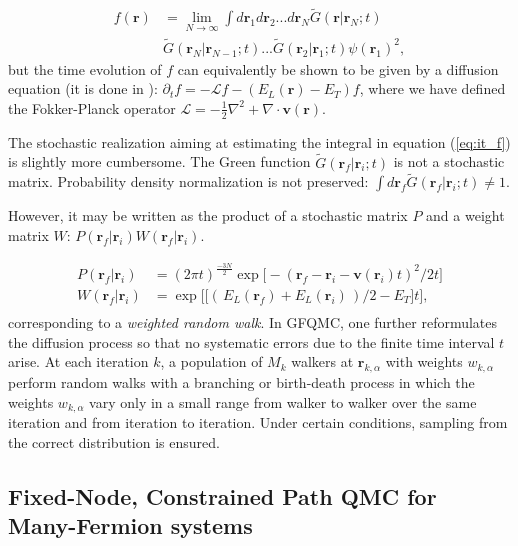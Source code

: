 \begin{equation}\label{eq:it_f}
\begin{split}
f(\bm r) &= \lim_{N\rightarrow \infty} \int d\bm r_1 d\bm r_2 ... d\bm r_N \tilde{G}(\bm r| \bm r_N ;t) \\
&\tilde{G}(\bm r_N| \bm r_{N-1} ;t) ... \tilde{G}(\bm r_2| \bm r_1 ;t) \psi(\bm r_1)^2 ,
\end{split}
\end{equation}
but the time evolution of $f$ can equivalently be shown to be given by a diffusion equation (it is done in \cite{vmc_review}): $\partial_t f = -\mathcal{L}f - (E_L (\bm r) - E_T)f$, 
where we have defined the Fokker-Planck operator $\mathcal{L} = -\frac{1}{2}\nabla^2 + \nabla \cdot \bm v(\bm r)$.\par

The stochastic realization aiming at estimating the integral in equation (\ref{eq:it_f}) is slightly more cumbersome. The Green function $\tilde{G}(\bm r_f| \bm r_i ;t)$ is not a stochastic matrix. Probability density normalization is not preserved: $\int d\bm r_f \tilde{G} ( \bm r_f | \bm r_i ; t) \neq 1$.

However, it may be written as the product of a stochastic matrix $P$ and a weight matrix $W$: $P(\bm r_f | \bm r_i) W ( \bm r_f | \bm r_i )$.

\begin{equation}
\begin{split}
P(\bm r_f | \bm r_i) &= (2\pi t)^{\frac{-3N}{2}} \exp{\bigg[-(\bm r_f -\bm r_i - \bm v(\bm r_i)t )^2 / 2t \bigg]} \\
W ( \bm r_f | \bm r_i ) &= \exp{\bigg[ \big[ (\, E_L (\bm r_f) + E_L (\bm r_i) \, )/2 - E_T \big] t \bigg]} , \\
\end{split}
\end{equation}
corresponding to a \emph{weighted random walk}. In GFQMC, one further reformulates the diffusion process so that no systematic errors due to the finite time interval $t$ arise. At each iteration $k$, a population of $M_k$ walkers at $\bm r_{k, \alpha}$ with weights $w_{k, \alpha}$ perform random walks with a branching or birth-death process in which the weights $w_{k, \alpha}$ vary only in a small range from walker to walker over the same iteration and from iteration to iteration. Under certain conditions, sampling from the correct distribution is ensured.

\subsection{Fixed-Node, Constrained Path QMC for Many-Fermion systems}

